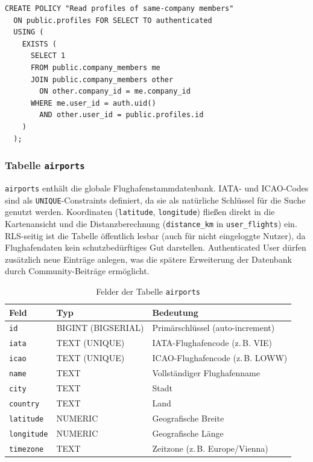 \begin{lstlisting}[style=skyline-sql,
  caption={Sichtbarkeit von Profilen innerhalb einer Company (supabasesql.txt)},
  label={lst:profiles_rls_company}]
CREATE POLICY "Read profiles of same-company members"
  ON public.profiles FOR SELECT TO authenticated
  USING (
    EXISTS (
      SELECT 1
      FROM public.company_members me
      JOIN public.company_members other
        ON other.company_id = me.company_id
      WHERE me.user_id = auth.uid()
        AND other.user_id = public.profiles.id
    )
  );
\end{lstlisting}

\subsubsection*{Tabelle \texttt{airports}}

\texttt{airports} enthält die globale Flughafenstammdatenbank.
IATA- und ICAO-Codes sind als \texttt{UNIQUE}-Constraints definiert,
da sie als natürliche Schlüssel für die Suche genutzt werden.
Koordinaten (\texttt{latitude}, \texttt{longitude}) fließen direkt in die
Kartenansicht und die Distanzberechnung (\texttt{distance\_km} in
\texttt{user\_flights}) ein.
RLS-seitig ist die Tabelle öffentlich lesbar (auch für nicht eingeloggte Nutzer),
da Flughafendaten kein schutzbedürftiges Gut darstellen.
Authenticated User dürfen zusätzlich neue Einträge anlegen, was die
spätere Erweiterung der Datenbank durch Community-Beiträge ermöglicht.

\begin{table}[H]
  \centering
  \caption{Felder der Tabelle \texttt{airports}}
  \label{tab:airports_felder}
  \begin{tabularx}{\textwidth}{l l X}
    \toprule
    \textbf{Feld} & \textbf{Typ} & \textbf{Bedeutung} \\
    \midrule
    \texttt{id}        & BIGINT (BIGSERIAL) & Primärschlüssel (auto-increment) \\
    \texttt{iata}      & TEXT (UNIQUE)      & IATA-Flughafencode (z.\,B. VIE) \\
    \texttt{icao}      & TEXT (UNIQUE)      & ICAO-Flughafencode (z.\,B. LOWW) \\
    \texttt{name}      & TEXT               & Vollständiger Flughafenname \\
    \texttt{city}      & TEXT               & Stadt \\
    \texttt{country}   & TEXT               & Land \\
    \texttt{latitude}  & NUMERIC            & Geografische Breite \\
    \texttt{longitude} & NUMERIC            & Geografische Länge \\
    \texttt{timezone}  & TEXT               & Zeitzone (z.\,B. Europe/Vienna) \\
    \bottomrule
  \end{tabularx}
\end{table}

